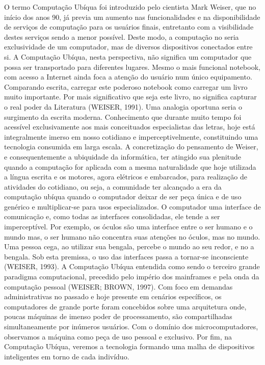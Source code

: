 \documentclass[12pt,a4paper,compsoc]{IEEEtran}
\begin{document}
O termo Computação Ubíqua foi introduzido pelo cientista Mark Weiser, que no início dos anos 90, já previa um aumento nas funcionalidades e na disponibilidade de serviços de computação para os usuários finais, entretanto com a visibilidade destes serviços sendo a menor possível. Deste modo, a computação no seria exclusividade de um computador, mas de diversos dispositivos conectados entre si.
A Computação Ubíqua, nesta perspectiva, não significa um computador que possa ser transportado para diferentes lugares. Mesmo o mais funcional notebook, com acesso a Internet ainda foca a atenção do usuário num único equipamento. Comparando  escrita, carregar este poderoso notebook  como carregar um livro muito importante. Por mais significativo que seja este livro, no significa capturar o real poder da Literatura (WEISER, 1991).
Uma analogia oportuna seria o surgimento da escrita moderna. Conhecimento que durante muito tempo foi acessível exclusivamente aos mais conceituados especialistas das letras, hoje está integralmente imerso em nosso cotidiano e imperceptivelmente, constituindo uma tecnologia consumida em larga escala.
A concretização do pensamento de Weiser, e consequentemente a ubiquidade da informática, ter atingido sua plenitude quando a computação for aplicada com a mesma naturalidade que hoje  utilizada a língua escrita e os motores, agora elétricos e embarcados, para realização de atividades do cotidiano, ou seja, a comunidade ter alcançado a era da computação ubíqua quando o computador deixar de ser peça única e de uso genérico e multiplicar-se para usos especializados.
O computador uma interface de comunicação e, como todas as interfaces consolidadas, ele tende a ser imperceptível. Por exemplo, os óculos são uma interface entre o ser humano e o mundo mas, o ser humano não concentra suas atenções no óculos, mas no mundo. Uma pessoa cega, ao utilizar sua bengala, percebe o mundo ao seu redor, e no a bengala. Sob esta premissa, o uso das interfaces passa a tornar-se inconsciente (WEISER, 1993).
A Computação Ubíqua entendida como sendo o terceiro grande paradigma computacional, precedido pelo império dos mainframes e pela onda da computação pessoal (WEISER; BROWN, 1997). Com foco em demandas administrativas no passado e hoje presente em cenários específicos, os computadores de grande porte foram concebidos sobre uma arquitetura onde, poucas máquinas de imenso poder de processamento, são compartilhadas simultaneamente por inúmeros usuários. Com o domínio dos microcomputadores, observamos a máquina como peça de uso pessoal e exclusivo. Por fim, na Computação Ubíqua, veremos a tecnologia formando uma malha de dispositivos inteligentes em torno de cada indivíduo.
\end{document}
